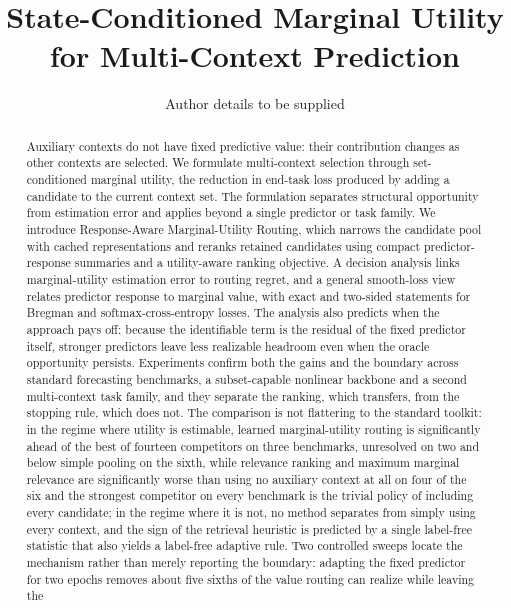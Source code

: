 \documentclass[journal,10pt]{IEEEtran}
\theoremstyle{definition}
\begin{document}
\title{State-Conditioned Marginal Utility for Multi-Context Prediction}
\author{Author details to be supplied}
\maketitle
\begin{abstract}
Auxiliary contexts do not have fixed predictive value: their contribution
changes as other contexts are selected. We formulate multi-context selection
through set-conditioned marginal utility, the reduction in end-task loss
produced by adding a candidate to the current context set. The formulation
separates structural opportunity from estimation error and applies beyond a
single predictor or task family. We introduce Response-Aware Marginal-Utility
Routing, which narrows the candidate pool with cached representations and
reranks retained candidates using compact predictor-response summaries and a
utility-aware ranking objective. A decision analysis links marginal-utility
estimation error to routing regret, and a general smooth-loss view relates
predictor response to marginal value, with exact and two-sided statements for
Bregman and softmax-cross-entropy losses. The analysis also predicts when the approach pays off:
because the identifiable term is the residual of the fixed predictor itself,
stronger predictors leave less realizable headroom even when the oracle
opportunity persists. Experiments confirm both the gains and the boundary
across standard forecasting benchmarks, a subset-capable nonlinear backbone and
a second multi-context task family, and they separate the ranking, which
transfers, from the stopping rule, which does not. The comparison is not
flattering to the standard toolkit: in the regime where utility is estimable,
learned marginal-utility routing is significantly ahead of the best of fourteen
competitors on three benchmarks, unresolved on two and below simple pooling on
the sixth, while relevance ranking and maximum marginal relevance are
significantly worse than using no auxiliary context at all on four of the six
and the strongest competitor on every benchmark is the trivial policy of
including every candidate; in the regime where it is not, no
method separates from simply using every context, and the sign of the retrieval
heuristic is predicted by a single label-free statistic that also yields a
label-free adaptive rule. Two controlled sweeps locate the mechanism rather
than merely reporting the boundary: adapting the fixed predictor for two epochs
removes about five sixths of the value routing can realize while leaving the

\end{abstract}
\end{document}
